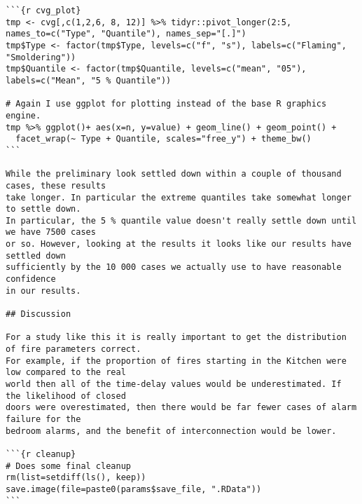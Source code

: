 \begin{lstlisting}[basicstyle=\scriptsize]
```{r cvg_plot}
tmp <- cvg[,c(1,2,6, 8, 12)] %>% tidyr::pivot_longer(2:5, names_to=c("Type", "Quantile"), names_sep="[.]")
tmp$Type <- factor(tmp$Type, levels=c("f", "s"), labels=c("Flaming", "Smoldering"))
tmp$Quantile <- factor(tmp$Quantile, levels=c("mean", "05"), labels=c("Mean", "5 % Quantile"))

# Again I use ggplot for plotting instead of the base R graphics engine.
tmp %>% ggplot()+ aes(x=n, y=value) + geom_line() + geom_point() +
  facet_wrap(~ Type + Quantile, scales="free_y") + theme_bw()
```

While the preliminary look settled down within a couple of thousand cases, these results
take longer. In particular the extreme quantiles take somewhat longer to settle down.
In particular, the 5 % quantile value doesn't really settle down until we have 7500 cases
or so. However, looking at the results it looks like our results have settled down
sufficiently by the 10 000 cases we actually use to have reasonable confidence
in our results.

## Discussion

For a study like this it is really important to get the distribution of fire parameters correct.
For example, if the proportion of fires starting in the Kitchen were low compared to the real
world then all of the time-delay values would be underestimated. If the likelihood of closed
doors were overestimated, then there would be far fewer cases of alarm failure for the
bedroom alarms, and the benefit of interconnection would be lower.

```{r cleanup}
# Does some final cleanup
rm(list=setdiff(ls(), keep))
save.image(file=paste0(params$save_file, ".RData"))
```

\end{lstlisting}


